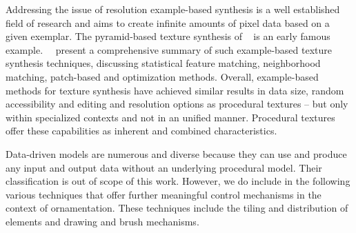 Addressing the issue of resolution example-based synthesis is a well established field of research and aims to create infinite amounts of pixel data based on a given exemplar. The pyramid-based texture synthesis of \citeauthor*{heeger_1995_pbt}~\cite{heeger_1995_pbt} is an early famous example.~\citeauthor*{wei_2009_seb}~\cite{wei_2009_seb} present a comprehensive summary of such example-based texture synthesis techniques, discussing statistical feature matching, neighborhood matching, patch-based and optimization methods. Overall, example-based methods for texture synthesis have achieved similar results in data size, random accessibility and editing and resolution options as procedural textures – but only within specialized contexts and not in an unified manner. Procedural textures offer these capabilities as inherent and combined characteristics.

Data-driven models are numerous and diverse because they can use and produce any input and output data without an underlying procedural model. Their classification is out of scope of this work. However, we do include in the following various techniques that offer further meaningful control mechanisms in the context of ornamentation. These techniques include the tiling and distribution of elements and drawing and brush mechanisms.

